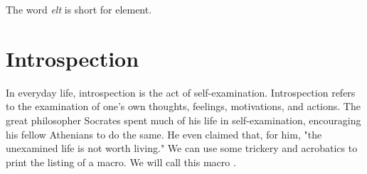 
The word \textit{elt} is short for element.

%
%
%
%
%
%
%
%
%
%
%
%
%

\makeatother




\section*{Introspection}
In everyday life, introspection is the act of self-examination. Introspection refers to the examination of one's own thoughts, feelings, motivations, and actions. The great philosopher Socrates spent much of his life in self-examination, encouraging his fellow Athenians to do the same. He even claimed that, for him, "the unexamined life is not worth living." We can use some \tex trickery and \latex acrobatics to print the listing of a macro. We will call this macro .

\begin{teX}
\def\reflect{\@star@or@long\accommand}
\def\accommand#1{\string#1:%
  \expandafter\strip@prefix\meaning#1} 
\end{teX}

